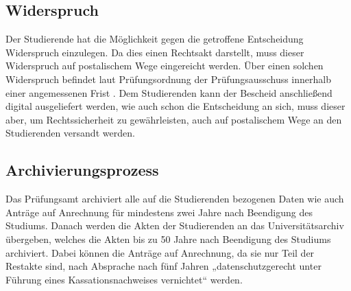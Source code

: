 \subsection{Widerspruch}
Der Studierende hat die Möglichkeit gegen die getroffene Entscheidung Widerspruch einzulegen. Da dies einen Rechtsakt darstellt, muss dieser Widerspruch auf postalischem Wege eingereicht werden. Über einen solchen Widerspruch befindet laut Prüfungsordnung der Prüfungsausschuss innerhalb einer angemessenen Frist \parencite{pruefungsordnung_ba}. Dem Studierenden kann der Bescheid anschließend digital ausgeliefert werden, wie auch schon die Entscheidung an sich, muss dieser aber, um Rechtssicherheit zu gewährleisten, auch auf postalischem Wege an den Studierenden versandt werden.

\subsection{Archivierungsprozess}
Das Prüfungsamt archiviert alle auf die Studierenden bezogenen Daten wie auch Anträge auf Anrechnung für mindestens zwei Jahre nach Beendigung des Studiums. Danach werden die Akten der Studierenden an das Universitätsarchiv übergeben, welches die Akten bis zu 50 Jahre nach Beendigung des Studiums archiviert. Dabei können die Anträge auf Anrechnung, da sie nur Teil der Restakte sind, nach Absprache nach fünf Jahren „datenschutzgerecht unter Führung eines Kassationsnachweises vernichtet“ \parencite{archivierung} werden.


